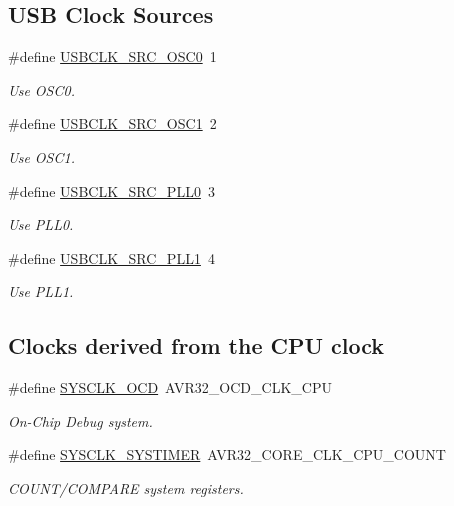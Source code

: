 \subsection*{\-U\-S\-B \-Clock \-Sources}
\begin{DoxyCompactItemize}
\item 
\#define \hyperlink{group__sysclk__group_ga2ba06598e685f870cb3f410f27d75703}{\-U\-S\-B\-C\-L\-K\-\_\-\-S\-R\-C\-\_\-\-O\-S\-C0}~1
\begin{DoxyCompactList}\small\item\em \-Use \-O\-S\-C0. \end{DoxyCompactList}\item 
\#define \hyperlink{group__sysclk__group_ga5fee2b76449663f9d6c8f7bb34782e77}{\-U\-S\-B\-C\-L\-K\-\_\-\-S\-R\-C\-\_\-\-O\-S\-C1}~2
\begin{DoxyCompactList}\small\item\em \-Use \-O\-S\-C1. \end{DoxyCompactList}\item 
\#define \hyperlink{group__sysclk__group_ga969e47c6c1f1d38fd2afaf96f6187296}{\-U\-S\-B\-C\-L\-K\-\_\-\-S\-R\-C\-\_\-\-P\-L\-L0}~3
\begin{DoxyCompactList}\small\item\em \-Use \-P\-L\-L0. \end{DoxyCompactList}\item 
\#define \hyperlink{group__sysclk__group_gae76666294ec5d1ca2bcfa28061cfae3f}{\-U\-S\-B\-C\-L\-K\-\_\-\-S\-R\-C\-\_\-\-P\-L\-L1}~4
\begin{DoxyCompactList}\small\item\em \-Use \-P\-L\-L1. \end{DoxyCompactList}\end{DoxyCompactItemize}
\subsection*{\-Clocks derived from the \-C\-P\-U clock}
\begin{DoxyCompactItemize}
\item 
\#define \hyperlink{group__sysclk__group_ga9cbdb318d23dda372bf52dd9b4eb14f5}{\-S\-Y\-S\-C\-L\-K\-\_\-\-O\-C\-D}~\-A\-V\-R32\-\_\-\-O\-C\-D\-\_\-\-C\-L\-K\-\_\-\-C\-P\-U
\begin{DoxyCompactList}\small\item\em \-On-\/\-Chip \-Debug system. \end{DoxyCompactList}\item 
\#define \hyperlink{group__sysclk__group_ga619d74a2528721833b011475c6ea1b63}{\-S\-Y\-S\-C\-L\-K\-\_\-\-S\-Y\-S\-T\-I\-M\-E\-R}~\-A\-V\-R32\-\_\-\-C\-O\-R\-E\-\_\-\-C\-L\-K\-\_\-\-C\-P\-U\-\_\-\-C\-O\-U\-N\-T
\begin{DoxyCompactList}\small\item\em \-C\-O\-U\-N\-T/\-C\-O\-M\-P\-A\-R\-E system registers. \end{DoxyCompactList}\end{DoxyCompactItemize}
